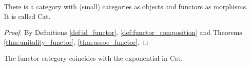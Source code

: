 \begin{theorem}
  There is a category with (small) categories as objects and functors as
  morphisms. It is called Cat.

  \begin{proof}
    By Definitions \ref{def:id_functor}, \ref{def:functor_composition} and Theorems \ref{thm:unitality_functor}, \ref{thm:assoc_functor}.
  \end{proof}
\end{theorem}

\begin{remark}
  The functor category coincides with the exponential in Cat.
\end{remark}

\newpage